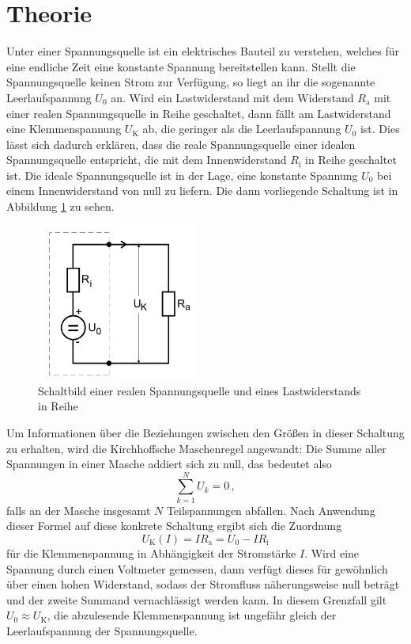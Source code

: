 \section{Theorie}
\label{sec:Theorie}
Unter einer Spannungsquelle ist ein elektrisches Bauteil zu verstehen,
welches für eine endliche Zeit eine konstante Spannung bereitstellen kann. Stellt die
Spannungsquelle keinen Strom zur Verfügung, so liegt an ihr die sogenannte Leerlaufspannung
$U_0$ an. Wird ein Lastwiderstand mit dem Widerstand $R_\text{a}$ mit
einer realen Spannungsquelle in Reihe geschaltet, dann fällt am Lastwiderstand
eine Klemmenspannung $U_\text{K}$ ab, die geringer als die Leerlaufspannung $U_0$
ist. Dies lässt sich dadurch erklären, dass die reale Spannungsquelle einer
idealen Spannungsquelle entspricht, die mit dem Innenwiderstand
$R_\text{i}$ in Reihe geschaltet ist. Die ideale Spannungsquelle ist in der Lage,
eine konstante Spannung $U_0$ bei einem Innenwiderstand von null zu liefern.
Die dann vorliegende Schaltung ist in Abbildung \ref{fig:ersatzschaltbild} zu sehen.

\begin{figure}
  \centering
  \includegraphics[width=150pt]{data/ersatzschaltbild.png}
  \caption{Schaltbild einer realen Spannungsquelle und eines Lastwiderstands in Reihe \cite{Versuchsanleitung}}
  \label{fig:ersatzschaltbild}
\end{figure}

Um Informationen über die Beziehungen zwischen den Größen in dieser Schaltung zu erhalten,
wird die Kirchhoffsche Maschenregel angewandt: Die Summe aller Spannungen in einer
Masche addiert sich zu null, das bedeutet also
\begin{equation}
  \sum\limits_{k=1}^N U_k = 0\,,
  \label{eqn:kirchhoffmasche}
\end{equation}
falls an der Masche insgesamt $N$ Teilspannungen abfallen.
Nach Anwendung dieser Formel auf diese konkrete Schaltung ergibt sich die Zuordnung
\begin{equation}
  U_\text{K}(I) = I R_\text{a} = U_0 - I R_\text{i}
  \label{eqn:klemmevoni}
\end{equation}
für die Klemmenspannung in Abhängigkeit der Stromstärke $I$. Wird eine Spannung durch
einen Voltmeter gemessen, dann verfügt dieses für gewöhnlich über einen hohen Widerstand,
sodass der Stromfluss näherungsweise null beträgt und der zweite Summand vernachlässigt
werden kann.
In diesem Grenzfall gilt $U_0 \approx U_\text{K}$, die abzulesende
Klemmenspannung ist ungefähr gleich der Leerlaufspannung der Spannungsquelle.

